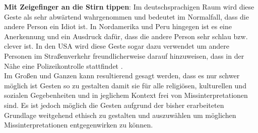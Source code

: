 \textbf{Mit Zeigefinger an die Stirn tippen}: Im deutschsprachigen Raum wird diese Geste als sehr abwärtend wahrgenommen und bedeutet im Normalfall, dass die andere Person ein Idiot ist. In Nordamerika und Peru hingegen ist es eine Anerkennung und ein Ausdruck dafür, dass die andere Person sehr schlau bzw. clever ist. In den USA wird diese Geste sogar dazu verwendet um andere Personen im Straßenverkehr freundlicherweise darauf hinzuweisen, dass in der Nähe eine Polizeikontrolle stattfindet \cite{handzeichen_gesten_2018}.\\

Im Großen und Ganzen kann resultierend gesagt werden, dass es nur schwer möglich ist Gesten so zu gestalten damit sie für alle religiösen, kulturellen und sozialen Gegebenheiten und in jeglichem Kontext frei von Missinterpretationen sind. Es ist jedoch möglich die Gesten aufgrund der bisher erarbeiteten Grundlage weitgehend ethisch zu gestalten und auszuwählen um möglichen Missinterpretationen entgegenwirken zu können.

